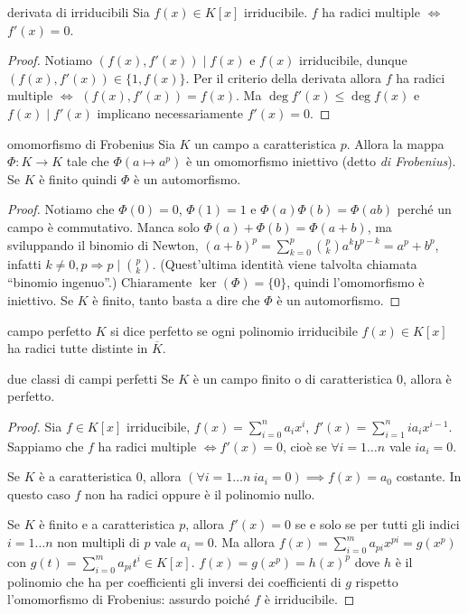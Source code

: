 \begin{corollary}{derivata di irriducibili}
    Sia $f(x) \in K[x]$ irriducibile.  $f$ ha radici multiple $\Leftrightarrow$ $f'(x) = 0$.
\end{corollary}
\begin{proof}
    Notiamo $(f(x),f'(x)) \mid f(x)$ e $f(x)$ irriducibile, dunque $(f(x),f'(x)) \in \{1,f(x)\}$. Per il criterio della derivata allora $f$ ha radici multiple $\Leftrightarrow$ $(f(x),f'(x)) = f(x)$. Ma $\deg f'(x) \leq \deg f(x)$ e $f(x) \mid f'(x)$ implicano necessariamente $f'(x)=0$.
\end{proof}
\begin{proposition}{omomorfismo di Frobenius}
    Sia $K$ un campo a caratteristica $p$. Allora la mappa $\Phi: K \rightarrow K$ tale che $\Phi(a \mapsto a^p)$ è un omomorfismo iniettivo (detto \textit{di Frobenius}). Se $K$ è finito quindi $\Phi$ è un automorfismo.
\end{proposition}
\begin{proof}
    Notiamo che $\Phi(0)=0$, $\Phi(1)=1$ e $\Phi(a)\Phi(b) = \Phi(ab)$ perché un campo è commutativo. Manca solo $\Phi(a) + \Phi(b) = \Phi(a+b)$, ma sviluppando il binomio di Newton, $(a+b)^p = \sum_{k=0}^p \binom{p}{k}a^kb^{p-k} = a^p+b^p$, infatti $k\neq0,p \Rightarrow p \mid \binom{p}{k}$. (Quest'ultima identità viene talvolta chiamata ``binomio ingenuo''.) Chiaramente $\ker(\Phi) = \{0\}$, quindi l'omomorfismo è iniettivo. Se $K$ è finito, tanto basta a dire che $\Phi$ è un automorfismo.
\end{proof}
\begin{definition}{campo perfetto}
    $K$ si dice perfetto se ogni polinomio irriducibile $f(x) \in K[x]$ ha radici tutte distinte in $\overline{K}$.
\end{definition}
\begin{proposition}{due classi di campi perfetti}
    Se $K$ è un campo finito o di caratteristica 0, allora è perfetto.
\end{proposition}
\begin{proof}
    Sia $f\in K[x]$ irriducibile, $f(x) = \sum_{i=0}^n a_ix^i$, $f'(x) = \sum_{i = 1}^{n}{i a_i x^{i-1}}$. Sappiamo che $f$ ha radici multiple $\iff f'(x) = 0$, cioè se $\forall i = 1 \dots n$ vale  $i a_i = 0$.
    
    Se $K$ è a caratteristica 0, allora $(\forall i = 1 \dots n \ i a_i = 0) \implies f(x) = a_0$ costante. In questo caso $f$ non ha radici oppure è il polinomio nullo.
    
    Se $K$ è finito e a caratteristica $p$, allora $f'(x) = 0$ se e solo se per tutti gli indici $i = 1 \dots n$ non multipli di $p$ vale $a_i = 0$. Ma allora $f(x) = \sum_{i=0}^m a_{pi}x^{pi} = g(x^p)$ con $g(t) = \sum_{i=0}^{m} a_{pi}t^i \in K[x]$. $f(x) = g(x^p) = h(x)^p$ dove $h$ è il polinomio che ha per coefficienti gli inversi dei coefficienti di $g$ rispetto l'omomorfismo di Frobenius: assurdo poiché $f$ è irriducibile.
\end{proof}


